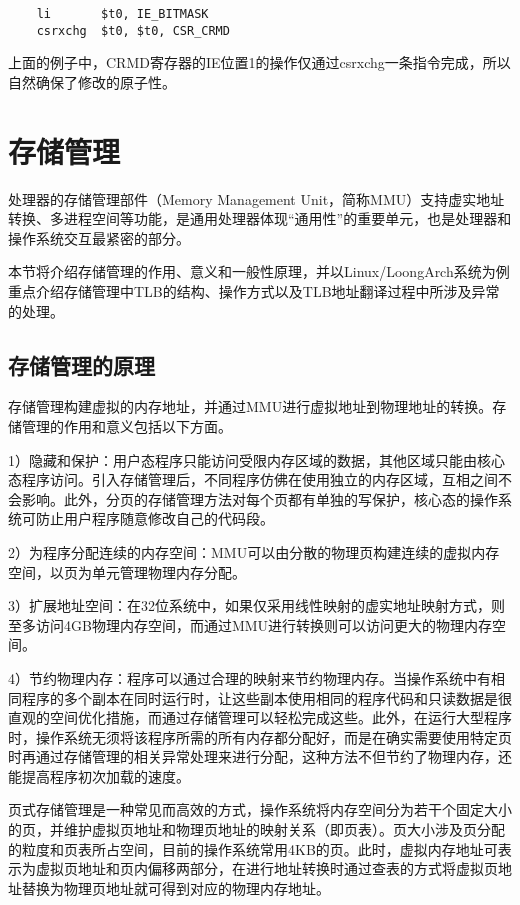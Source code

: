 \documentclass[]{ctexbook}
\begin{document}
\begin{verbatim}
    li       $t0, IE_BITMASK
    csrxchg  $t0, $t0, CSR_CRMD
\end{verbatim}

上面的例子中，CRMD寄存器的IE位置1的操作仅通过csrxchg一条指令完成，所以自然确保了修改的原子性。

\hypertarget{sec-memory-management}{%
\section{存储管理}\label{sec-memory-management}}

处理器的存储管理部件（Memory Management Unit，简称MMU）支持虚实地址转换、多进程空间等功能，是通用处理器体现``通用性''的重要单元，也是处理器和操作系统交互最紧密的部分。

本节将介绍存储管理的作用、意义和一般性原理，并以Linux/LoongArch系统为例重点介绍存储管理中TLB的结构、操作方式以及TLB地址翻译过程中所涉及异常的处理。

\hypertarget{ux5b58ux50a8ux7ba1ux7406ux7684ux539fux7406}{%
\subsection{存储管理的原理}\label{ux5b58ux50a8ux7ba1ux7406ux7684ux539fux7406}}

存储管理构建虚拟的内存地址，并通过MMU进行虚拟地址到物理地址的转换。存储管理的作用和意义包括以下方面。

1）隐藏和保护：用户态程序只能访问受限内存区域的数据，其他区域只能由核心态程序访问。引入存储管理后，不同程序仿佛在使用独立的内存区域，互相之间不会影响。此外，分页的存储管理方法对每个页都有单独的写保护，核心态的操作系统可防止用户程序随意修改自己的代码段。

2）为程序分配连续的内存空间：MMU可以由分散的物理页构建连续的虚拟内存空间，以页为单元管理物理内存分配。

3）扩展地址空间：在32位系统中，如果仅采用线性映射的虚实地址映射方式，则至多访问4GB物理内存空间，而通过MMU进行转换则可以访问更大的物理内存空间。

4）节约物理内存：程序可以通过合理的映射来节约物理内存。当操作系统中有相同程序的多个副本在同时运行时，让这些副本使用相同的程序代码和只读数据是很直观的空间优化措施，而通过存储管理可以轻松完成这些。此外，在运行大型程序时，操作系统无须将该程序所需的所有内存都分配好，而是在确实需要使用特定页时再通过存储管理的相关异常处理来进行分配，这种方法不但节约了物理内存，还能提高程序初次加载的速度。

页式存储管理是一种常见而高效的方式，操作系统将内存空间分为若干个固定大小的页，并维护虚拟页地址和物理页地址的映射关系（即页表）。页大小涉及页分配的粒度和页表所占空间，目前的操作系统常用4KB的页。此时，虚拟内存地址可表示为虚拟页地址和页内偏移两部分，在进行地址转换时通过查表的方式将虚拟页地址替换为物理页地址就可得到对应的物理内存地址。
\end{document}
